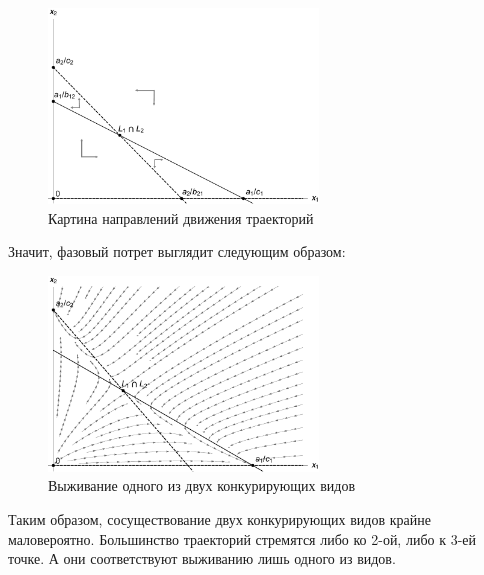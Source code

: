 \documentclass[12pt,a4paper]{article}
\begin{document}
    \pagebreak

    \begin{figure}[h]
        \centering
        \includegraphics[width=0.64\textwidth]{areas_2*.pdf}
        \caption{Картина направлений движения траекторий}
        \label{fig:areas_2*}
    \end{figure}
    
    Значит, фазовый потрет выглядит следующим образом:
    \begin{figure}[h]
        \centering
        \includegraphics[width=0.64\textwidth]{phase_2.pdf}
        \caption{Выживание одного из двух конкурирующих видов}
        \label{fig:phase_2}
    \end{figure}

    Таким образом, сосуществование двух конкурирующих видов крайне маловероятно. Большинство траекторий стремятся либо ко 2-ой, либо к 3-ей точке. А они соответствуют выживанию лишь одного из видов.
\end{document}
